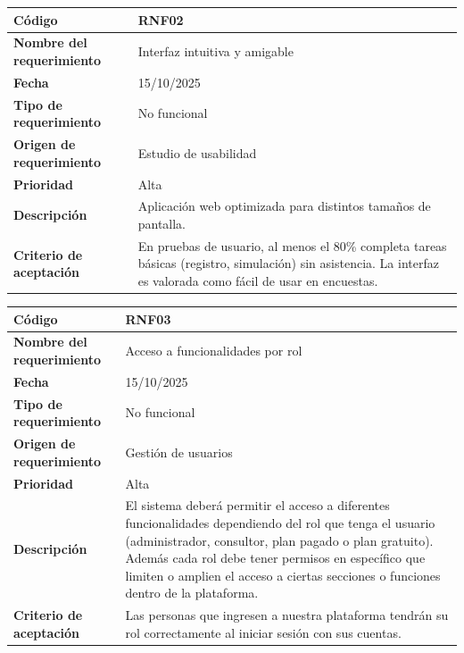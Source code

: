 \begin{table}[H]
	\begin{tabular}{|s{5cm}|m{11cm}|}
		\hline
		\textbf{Código} & RNF02 \\ \hline
		\textbf{Nombre del requerimiento} & Interfaz intuitiva y amigable \\ \hline
		\textbf{Fecha} & 15/10/2025 \\ \hline
		\textbf{Tipo de requerimiento} & No funcional \\ \hline
		\textbf{Origen de requerimiento} & Estudio de usabilidad \\ \hline
		\textbf{Prioridad} & Alta \\ \hline
		\textbf{Descripción} & Aplicación web optimizada para distintos tamaños de pantalla. \\ \hline
		\textbf{Criterio de aceptación} & En pruebas de usuario, al menos el 80\% completa tareas básicas (registro, simulación) sin asistencia. La interfaz es valorada como fácil de usar en encuestas. \\ \hline
	\end{tabular}
\end{table}

\begin{table}[H]
	\begin{tabular}{|s{5cm}|m{11cm}|}
		\hline
		\textbf{Código} & RNF03 \\ \hline
		\textbf{Nombre del requerimiento} & Acceso a funcionalidades por rol \\ \hline
		\textbf{Fecha} & 15/10/2025 \\ \hline
		\textbf{Tipo de requerimiento} & No funcional \\ \hline
		\textbf{Origen de requerimiento} & Gestión de usuarios \\ \hline
		\textbf{Prioridad} & Alta \\ \hline
		\textbf{Descripción} & El sistema deberá permitir el acceso a diferentes funcionalidades dependiendo del rol que tenga el usuario (administrador, consultor, plan pagado o plan gratuito). Además cada rol debe tener permisos en específico que limiten o amplien el acceso a ciertas secciones o funciones dentro de la plataforma. \\ \hline
		\textbf{Criterio de aceptación} & Las personas que ingresen a nuestra plataforma tendrán su rol correctamente al iniciar sesión con sus cuentas. \\ \hline
	\end{tabular}
\end{table}

